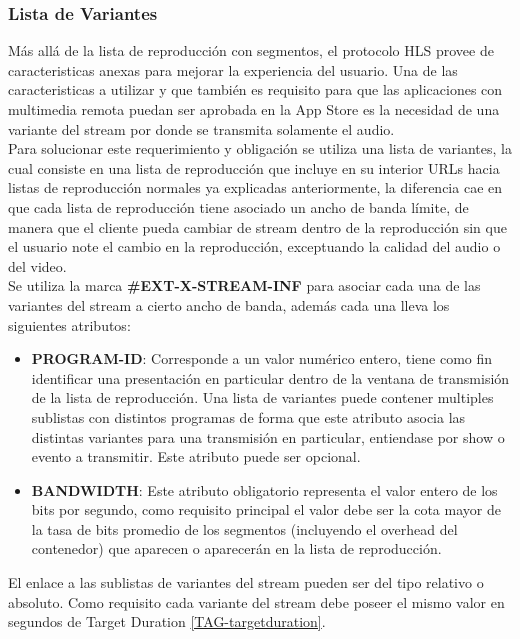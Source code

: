 \subsubsection{Lista de Variantes}
Más allá de la lista de reproducción con segmentos, el protocolo HLS provee de caracteristicas anexas para mejorar la experiencia del usuario.
Una de las caracteristicas a utilizar y que también es requisito para que las aplicaciones con multimedia remota puedan ser aprobada en la App Store es la necesidad de una variante del stream por donde se transmita solamente el audio.\\

Para solucionar este requerimiento y obligación se utiliza una lista de variantes, la cual consiste en una lista de reproducción que incluye en su interior URLs hacia listas de reproducción normales ya explicadas anteriormente, la diferencia cae en que cada lista de reproducción tiene asociado un ancho de banda límite, de manera que el cliente pueda cambiar de stream dentro de la reproducción sin que el usuario note el cambio en la reproducción, exceptuando la calidad del audio o del video.\\

Se utiliza la marca \textbf{\#EXT-X-STREAM-INF} para asociar cada una de las variantes del stream a cierto ancho de banda, además cada una lleva los siguientes atributos:

\begin{itemize}

\item \textbf{PROGRAM-ID}: Corresponde a un valor numérico entero, tiene como fin identificar una presentación en particular dentro de la ventana de transmisión de la lista de reproducción. Una lista de variantes puede contener multiples sublistas con distintos programas de forma que este atributo asocia las distintas variantes para una transmisión en particular, entiendase por show o evento a transmitir. Este atributo puede ser opcional.

\item \textbf{BANDWIDTH}: Este atributo obligatorio representa el valor entero de los bits por segundo, como requisito principal el valor debe ser la cota mayor de la tasa de bits promedio de los segmentos (incluyendo el overhead del contenedor) que aparecen o aparecerán en la lista de reproducción. 

\end{itemize}

El enlace a las sublistas de variantes del stream pueden ser del tipo relativo o absoluto. Como requisito cada variante del stream debe poseer el mismo valor en segundos de Target Duration \ref{TAG-targetduration}.

